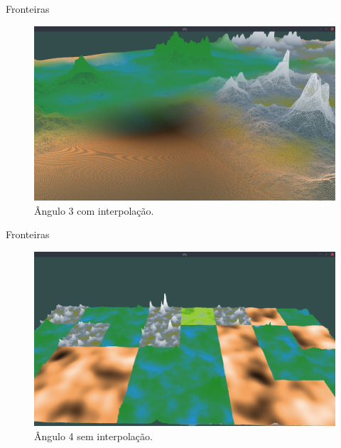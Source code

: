 \begin{frame}{Fronteiras}
    \begin{figure}[H]
        \centering
        \includegraphics[width=.9\textwidth]{img/border/a9/3c.png}
        \caption{Ângulo 3 com interpolação.}
        \label{fig:img_border_a9_3c}
    \end{figure}
    
\end{frame}

\begin{frame}{Fronteiras}
    \begin{figure}[H]
        \centering
        \includegraphics[width=.9\textwidth]{img/border/a9/4s.png}
        \caption{Ângulo 4 sem interpolação.}
        \label{fig:img_border_a9_4s}
    \end{figure}
    
\end{frame}


